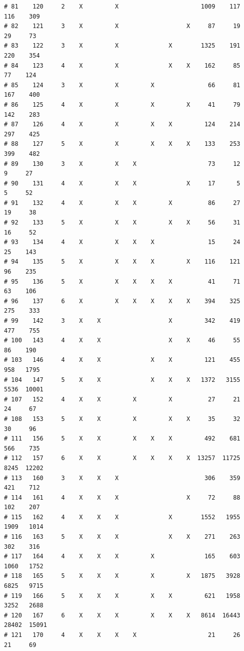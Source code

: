 \documentclass{article}\usepackage[]{graphicx}\usepackage[]{color}
\makeatletter
\newenvironment{kframe}{%
 \def\at@end@of@kframe{}%
 \ifinner\ifhmode%
  \def\at@end@of@kframe{\end{minipage}}%
  \begin{minipage}{\columnwidth}%
 \fi\fi%
 \def\FrameCommand##1{\hskip\@totalleftmargin \hskip-\fboxsep
 \colorbox{shadecolor}{##1}\hskip-\fboxsep
     \hskip-\linewidth \hskip-\@totalleftmargin \hskip\columnwidth}%
 \MakeFramed {\advance\hsize-\width
   \@totalleftmargin\z@ \linewidth\hsize
   \@setminipage}}%
 {\par\unskip\endMakeFramed%
 \at@end@of@kframe}
\newenvironment{knitrout}{}{} %
\makeatother
\begin{document}
\begin{knitrout}
\begin{kframe}
\begin{verbatim}
# 81    120     2    X         X                       1009    117    116    309
# 82    121     3    X         X                   X     87     19     29     73
# 83    122     3    X         X              X        1325    191    220    354
# 84    123     4    X         X              X    X    162     85     77    124
# 85    124     3    X         X         X               66     81    167    400
# 86    125     4    X         X         X         X     41     79    142    283
# 87    126     4    X         X         X    X         124    214    297    425
# 88    127     5    X         X         X    X    X    133    253    399    482
# 89    130     3    X         X    X                    73     12      9     27
# 90    131     4    X         X    X              X     17      5      5     52
# 91    132     4    X         X    X         X          86     27     19     38
# 92    133     5    X         X    X         X    X     56     31     16     52
# 93    134     4    X         X    X    X               15     24     25    143
# 94    135     5    X         X    X    X         X    116    121     96    235
# 95    136     5    X         X    X    X    X          41     71     63    106
# 96    137     6    X         X    X    X    X    X    394    325    275    333
# 99    142     3    X    X                   X         342    419    477    755
# 100   143     4    X    X                   X    X     46     55     86    190
# 103   146     4    X    X              X    X         121    455    958   1795
# 104   147     5    X    X              X    X    X   1372   3155   5536  10001
# 107   152     4    X    X         X         X          27     21     24     67
# 108   153     5    X    X         X         X    X     35     32     30     96
# 111   156     5    X    X         X    X    X         492    681    566    735
# 112   157     6    X    X         X    X    X    X  13257  11725   8245  12202
# 113   160     3    X    X    X                        306    359    421    712
# 114   161     4    X    X    X                   X     72     88    102    207
# 115   162     4    X    X    X              X        1552   1955   1909   1014
# 116   163     5    X    X    X              X    X    271    263    302    316
# 117   164     4    X    X    X         X              165    603   1060   1752
# 118   165     5    X    X    X         X         X   1875   3928   6825   9715
# 119   166     5    X    X    X         X    X         621   1958   3252   2688
# 120   167     6    X    X    X         X    X    X   8614  16443  28402  15091
# 121   170     4    X    X    X    X                    21     26     21     69

\end{verbatim}
\end{kframe}
\end{knitrout}
\end{document}
